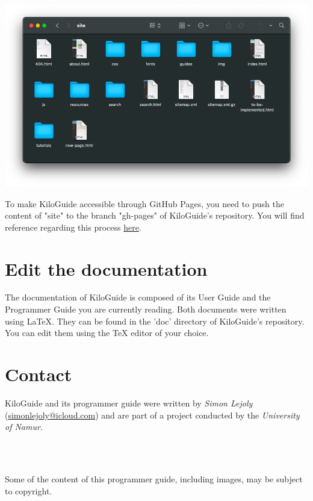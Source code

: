 \documentclass[a4paper,12pt,titlepage]{scrartcl}
\begin{document}
\begin{center}
    \includegraphics[scale=0.4]{new-site.png}
\end{center}

To make KiloGuide accessible through GitHub Pages, you need to push the content of "site" to the branch "gh-pages" of KiloGuide's repository. You will find reference regarding this process \href{https://www.mkdocs.org/user-guide/deploying-your-docs/#github-pages}{here}.

\section{Edit the documentation}

The documentation of KiloGuide is composed of its User Guide and the Programmer Guide you are currently reading. Both documents were written using LaTeX. They can be found in the 'doc' directory of KiloGuide's repository. You can  edit them using the TeX editor of your choice.

\section{Contact}

KiloGuide and its  programmer guide were written by \emph{Simon Lejoly} (\href{mailto:simonlejoly@icloud.com}{simonlejoly@icloud.com}) and are part of a project conducted by the \emph{University of Namur}.

\\\

Some of the content of this programmer guide, including images, may be subject to copyright.\\\\
\end{document}
